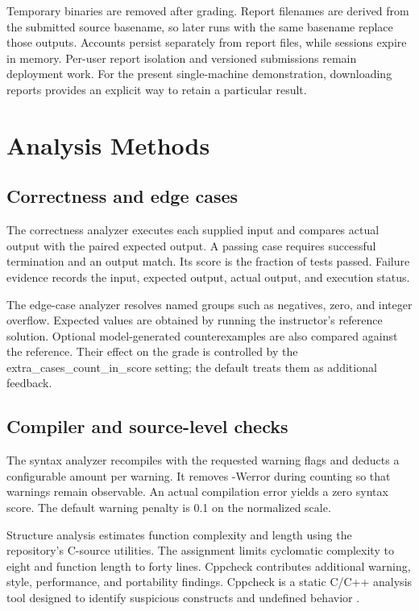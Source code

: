\documentclass[conference]{IEEEtran}
\begin{document}
Temporary binaries are removed after grading. Report filenames are derived from the submitted source basename, so later runs with the same basename replace those outputs. Accounts persist separately from report files, while sessions expire in memory. Per-user report isolation and versioned submissions remain deployment work. For the present single-machine demonstration, downloading reports provides an explicit way to retain a particular result.


\newpage

\section{Analysis Methods}

\subsection{Correctness and edge cases}

The correctness analyzer executes each supplied input and compares actual output with the paired expected output. A passing case requires successful termination and an output match. Its score is the fraction of tests passed. Failure evidence records the input, expected output, actual output, and execution status.


The edge-case analyzer resolves named groups such as negatives, zero, and integer overflow. Expected values are obtained by running the instructor's reference solution. Optional model-generated counterexamples are also compared against the reference. Their effect on the grade is controlled by the extra\_cases\_count\_in\_score setting; the default treats them as additional feedback.


\subsection{Compiler and source-level checks}

The syntax analyzer recompiles with the requested warning flags and deducts a configurable amount per warning. It removes -Werror during counting so that warnings remain observable. An actual compilation error yields a zero syntax score. The default warning penalty is 0.1 on the normalized scale.


Structure analysis estimates function complexity and length using the repository's C-source utilities. The assignment limits cyclomatic complexity to eight and function length to forty lines. Cppcheck contributes additional warning, style, performance, and portability findings. Cppcheck is a static C/C++ analysis tool designed to identify suspicious constructs and undefined behavior \cite{ref4}.
\end{document}
